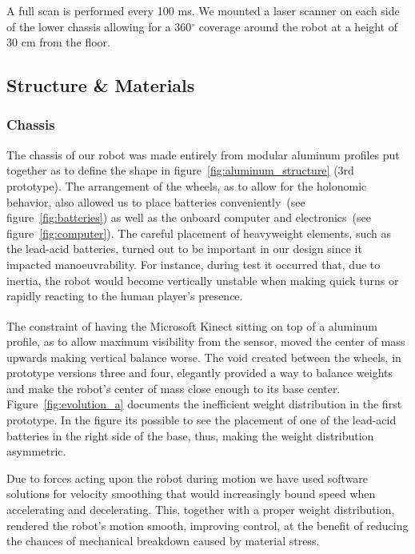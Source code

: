 A full scan is performed every 100 ms. We mounted a laser scanner on each side of the lower chassis allowing for a 360$^\circ$ coverage around the robot at a height of 30 cm from the floor.

\subsection{Structure \& Materials}
\subsubsection{Chassis}
The chassis of our robot was made entirely from modular aluminum profiles put together as to define the shape in figure~\ref{fig:aluminum_structure} (3rd prototype). The arrangement of the wheels, as to allow for the holonomic behavior, also allowed us to place batteries conveniently~(see figure~\ref{fig:batteries}) as well as the onboard computer and electronics~(see figure~\ref{fig:computer}). The careful placement of heavyweight elements, such as the lead-acid batteries, turned out to be important in our design since it impacted manoeuvrability. For instance, during test it occurred that, due to inertia, the robot would become vertically unstable when making quick turns or rapidly reacting to the human player's presence. 

The constraint of having the Microsoft Kinect\textsuperscript{\textregistered} sitting on top of a aluminum profile, as to allow maximum visibility from the sensor, moved the center of mass upwards making vertical balance worse. The void created between the wheels, in prototype versions three and four, elegantly provided a way to balance weights and make the robot's center of mass close enough to its base center. Figure~\ref{fig:evolution_a} documents the inefficient weight distribution in the first prototype. In the figure its possible to see the placement of one of the lead-acid batteries in the right side of the base, thus, making the weight distribution asymmetric.

Due to forces acting upon the robot during motion we have used software solutions for velocity smoothing that would increasingly bound speed when accelerating and decelerating. This, together with a proper weight distribution, rendered the robot's motion smooth, improving control, at the benefit of reducing the chances of mechanical breakdown caused by material stress.

